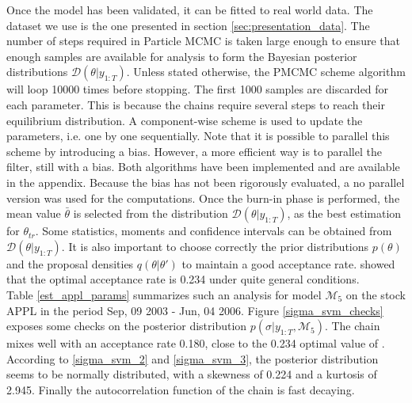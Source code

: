 \documentclass[11pt,a4,twosided,singlespacing,titlepagenumber=on]{scrreprt}
\numberwithin{equation}{chapter} %
\theoremstyle{remark}
\begin{document}
Once the model has been validated, it can be fitted to real world data. The dataset we use is the one presented in section \ref{sec:presentation_data}. The number of steps required in Particle MCMC is taken large enough to ensure that enough samples are available for analysis to form the Bayesian posterior distributions $\mathcal{D}(\theta|y_{1:T})$. Unless stated otherwise, the PMCMC scheme algorithm will loop 10000 times before stopping. The first 1000 samples are discarded for each parameter. This is because the chains require several steps to reach their equilibrium distribution. A component-wise scheme is used to update the parameters, i.e. one by one sequentially. Note that it is possible to parallel this scheme by introducing a bias. However, a more efficient way is to parallel the filter, still with a bias. Both algorithms have been implemented and are available in the appendix. Because the bias has not been rigorously evaluated, a no parallel version was used for the computations. Once the burn-in phase is performed, the mean value $\bar{\theta}$ is selected from the distribution $\mathcal{D}(\theta|y_{1:T})$, as the best estimation for $\theta_{tr}$. Some statistics, moments and confidence intervals can be obtained from $\mathcal{D}(\theta|y_{1:T})$. It is also important to choose correctly the prior distributions $p(\theta)$ and the proposal densities $q(\theta|\theta')$ to maintain a good acceptance rate. \cite{roberts1997} showed that the optimal acceptance rate is 0.234 under quite general conditions. \\
Table \ref{est_appl_params} summarizes such an analysis for model $\mathcal{M}_5$ on the stock APPL in the period Sep, 09 2003 - Jun, 04 2006. Figure \ref{sigma_svm_checks} exposes some checks on the posterior distribution $p(\sigma|y_{1:T}, \mathcal{M}_5)$. The chain mixes well with an acceptance rate 0.180, close to the 0.234 optimal value of \cite{roberts1997}. According to \ref{sigma_svm_2} and \ref{sigma_svm_3}, the posterior distribution seems to be normally distributed, with a skewness of 0.224 and a kurtosis of 2.945. Finally the autocorrelation function of the chain is fast decaying.
\end{document}
